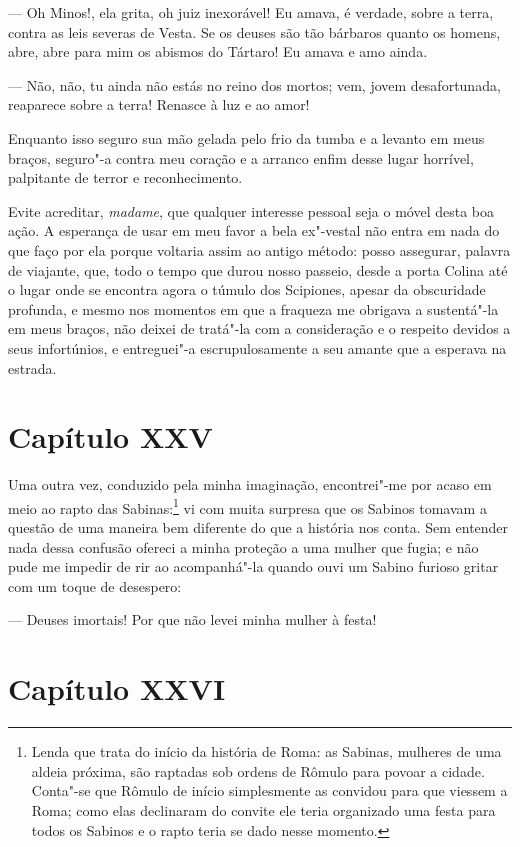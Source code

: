 --- Oh Minos!, ela grita, oh juiz inexorável! Eu amava, é verdade,
sobre a terra, contra as leis severas de Vesta. Se os deuses são tão
bárbaros quanto os homens, abre, abre para mim os abismos do Tártaro!
Eu amava e amo ainda. 

--- Não, não, tu ainda não estás no reino dos mortos; vem, jovem
desafortunada, reaparece sobre a terra! Renasce à luz e ao amor! 

Enquanto isso seguro sua mão gelada pelo frio da tumba e a levanto em
meus braços, seguro"-a contra meu coração e a arranco enfim desse lugar
horrível, palpitante de terror e reconhecimento. 

Evite acreditar, \textit{madame}, que qualquer interesse pessoal seja o
móvel desta boa ação. A esperança de usar em meu favor a bela ex"-vestal
não entra em nada do que faço por ela porque voltaria assim ao antigo
método: posso assegurar, palavra de viajante, que, todo o tempo que
durou nosso passeio, desde a porta Colina até o lugar onde se encontra
agora o túmulo dos Scipiones, apesar da obscuridade profunda, e mesmo
nos momentos em que a fraqueza me obrigava a sustentá"-la em meus
braços, não deixei de tratá"-la com a consideração e o respeito devidos
a seus infortúnios, e entreguei"-a escrupulosamente a seu amante que a
esperava na estrada.

\section*{Capítulo XXV}

 Uma outra vez, conduzido pela minha imaginação, encontrei"-me por acaso
em meio ao rapto das Sabinas:\footnote{ Lenda que trata do início da
história de Roma: as Sabinas, mulheres de uma aldeia próxima, são
raptadas sob ordens de Rômulo para povoar a cidade. Conta"-se que Rômulo
de início simplesmente as convidou para que viessem a Roma; como elas
declinaram do convite ele teria organizado uma festa para todos os
Sabinos e o rapto teria se dado nesse momento.} vi com muita surpresa
que os Sabinos tomavam a questão de uma maneira bem diferente do que a
história nos conta. Sem entender nada dessa confusão ofereci a minha
proteção a uma mulher que fugia; e não pude me impedir de rir ao
acompanhá"-la quando ouvi um Sabino furioso gritar com um toque de
desespero: 

 --- Deuses imortais! Por que não levei minha mulher à festa!

\section*{Capítulo XXVI}

